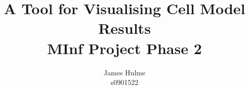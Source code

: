 \documentclass[11pt,a4paper]{article}
\begin{document}
\title{A Tool for Visualising Cell Model Results \\
       MInf Project Phase 2}
\author{James Hulme \\
        s0901522}

\maketitle
\thispagestyle{empty}

\newpage

\tableofcontents
\thispagestyle{empty}

\clearpage
\setcounter{page}{1}




%


\clearpage
%


%
%
\end{document}
